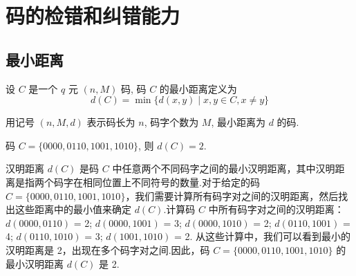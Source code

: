 \section{码的检错和纠错能力}
\subsection{最小距离}
\begin{definition}
    设 $ C $ 是一个 $ q $ 元 $ (n, M) $ 码, 码 $ C $ 的最小距离定义为
$$
d(C)=\min \{d(x, y) \mid x, y \in C, x \neq y\}
$$
\end{definition}
\begin{remark}
    用记号 $ (n, M, d) $ 表示码长为 $ n $, 码字个数为 $ M $, 最小距离为 $ d $ 的码.
\end{remark}
\begin{example}
    码 $ C=\{0000,0110,1001,1010\} $, 则 $ d(C)=2 $.

    汉明距离 \(d(C)\) 是码 \(C\) 中任意两个不同码字之间的最小汉明距离，其中汉明距离是指两个码字在相同位置上不同符号的数量.对于给定的码 \(C=\{0000, 0110, 1001, 1010\}\)，我们需要计算所有码字对之间的汉明距离，然后找出这些距离中的最小值来确定 \(d(C)\).计算码 \(C\) 中所有码字对之间的汉明距离：
 \(d(0000, 0110)\) = 2;
 \(d(0000, 1001)\) = 3;
 \(d(0000, 1010)\) = 2;
 \(d(0110, 1001)\) = 4;
 \(d(0110, 1010)\) = 3;
 \(d(1001, 1010)\) = 2.
从这些计算中，我们可以看到最小的汉明距离是 2，出现在多个码字对之间.因此，码 \(C=\{0000, 0110, 1001, 1010\}\) 的最小汉明距离 \(d(C)\) 是 2.
\end{example}


